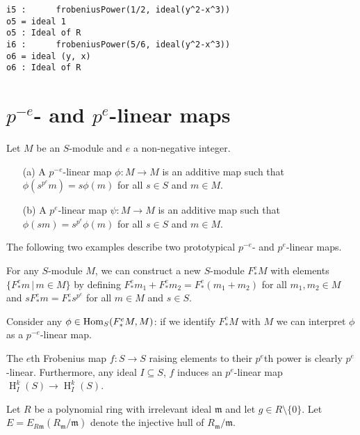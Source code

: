 \documentclass[11pt]{amsart}
\DeclareMathOperator{\HH}{H}
\begin{document}
\begin{verbatim}
i5 :      frobeniusPower(1/2, ideal(y^2-x^3))
o5 = ideal 1
o5 : Ideal of R
i6 :      frobeniusPower(5/6, ideal(y^2-x^3))
o6 = ideal (y, x)
o6 : Ideal of R
\end{verbatim}



\section{$p^{-e}$- and $p^{e}$-linear maps}\label{Section: p-linear maps}

\begin{definition}%
Let  $M$ be an $S$-module and $e$ a non-negative integer.
\begin{enumerate}
 \item[(a)] A $p^{-e}$-linear map $\phi:M \rightarrow M$ is an additive map such that
 $\phi(s^{p^e} m)= s\phi(m)$ for all $s\in S$ and $m\in M$.
 \item[(b)] A $p^{e}$-linear map $\psi:M \rightarrow M$ is an additive map such that
 $\phi(s m)= s^{p^e}\phi(m)$ for all $s\in S$ and $m\in M$.
\end{enumerate}
\end{definition}


The following two examples describe two prototypical
$p^{-e}$- and $p^{e}$-linear maps.
\begin{example}
For any $S$-module $M$, we can construct a new $S$-module $F_*^e M$ with elements $\{ F_*^e m \,|\,m\in M\}$ by defining
$F_*^e m_1 + F_*^e m_2 = F_*^e (m_1 +  m_2)$ for all $m_1, m_2 \in M$ and
$s F_*^e m= F_*^e s^{p^e}$ for all $m\in M$ and $s\in S$.

Consider any $\phi\in \operatorname{Hom}_S(F_*^e M, M)$: if we identify $F_*^e M$ with $M$ we can interpret $\phi$ as a $p^{-e}$-linear map.
\end{example}

\begin{example}
The $e$th Frobenius map $f:S \rightarrow S$  raising elements to their $p^e$th power is clearly $p^{e}$-linear.
Furthermore, any ideal $I\subseteq S$, $f$ induces an $p^{e}$-linear map $\HH_I^k (S) \rightarrow \HH_I^k (S)$.
\end{example}

Let $R$ be a polynomial ring with irrelevant ideal $\mathfrak{m}$ and let $g\in R\setminus \{0\}$.
Let $E=E_{R\mathfrak{m}}(R_{\mathfrak{m}}/\mathfrak{m})$ denote the injective hull of $R_{\mathfrak{m}}/\mathfrak{m}$.
\end{document}
